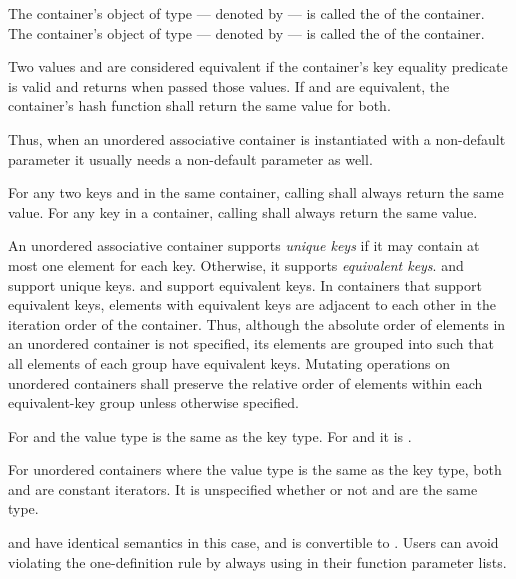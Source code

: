 \pnum
{}%
%
The container's object of type  --- denoted by
 --- is called the  of the
container. The container's object of type  ---
denoted by  --- is called the
 of the container.

\pnum
{}%
Two values  and  are
considered equivalent if the container's
key equality predicate
 is valid and returns
 when passed those values.  If  and
 are equivalent, the container's hash function shall
return the same value for both.
\begin{note}
Thus, when an unordered associative container is instantiated with
a non-default  parameter it usually needs a non-default 
parameter as well.
\end{note}
For any two keys  and  in the same container,
calling  shall always return the same value.
For any key  in a container, calling 
shall always return the same value.

\pnum
{}%
%
An unordered associative container supports \textit{unique keys} if it
may contain at most one element for each key.  Otherwise, it supports
\textit{equivalent keys}.   and 
support unique keys.  and 
support equivalent keys.  In containers that support equivalent keys,
elements with equivalent keys are adjacent to each other
in the iteration order of the container. Thus, although the absolute order
of elements in an unordered container is not specified, its elements are
grouped into  such that all elements of each
group have equivalent keys. Mutating operations on unordered containers shall
preserve the relative order of elements within each equivalent-key group
unless otherwise specified.

\pnum
For  and  the value type is
the same as the key type.  For  and
 it is .

\pnum
For unordered containers where the value type is the same as the key
type, both  and  are constant
iterators. It is unspecified whether or not  and
 are the same type.
\begin{note}
 and  have identical
semantics in this case, and  is convertible to
. Users can avoid violating the one-definition rule
by always using  in their function parameter lists.
\end{note}

